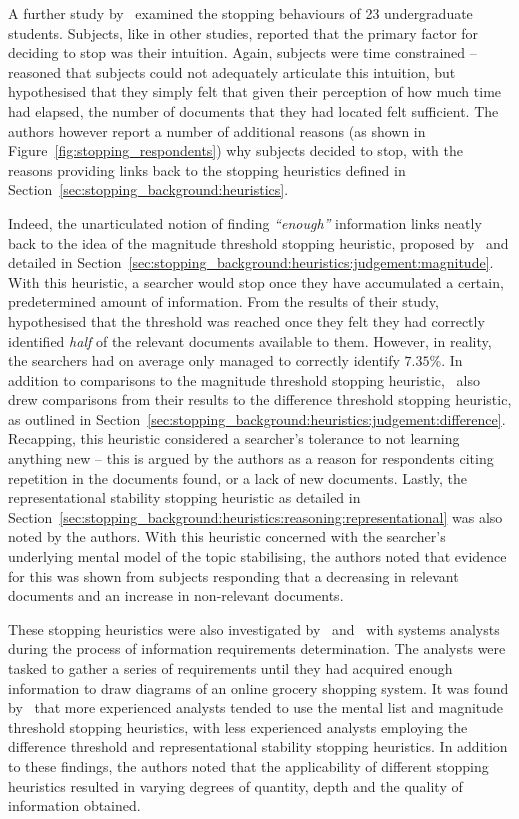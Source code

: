 A further study by~\cite{dostert2009satisficing} examined the stopping behaviours of 23 undergraduate students. Subjects, like in other studies, reported that the primary factor for deciding to stop was their intuition. Again, subjects were time constrained --~\cite{dostert2009satisficing} reasoned that subjects could not adequately articulate this intuition, but hypothesised that they simply felt that given their perception of how much time had elapsed, the number of documents that they had located felt sufficient. The authors however report a number of additional reasons (as shown in Figure~\ref{fig:stopping_respondents}) why subjects decided to stop, with the reasons providing links back to the stopping heuristics defined in Section~\ref{sec:stopping_background:heuristics}.

Indeed, the unarticulated notion of finding \emph{``enough''} information links neatly back to the idea of the magnitude threshold stopping heuristic, proposed by~\cite{nickles1995judgment} and detailed in Section~\ref{sec:stopping_background:heuristics:judgement:magnitude}. With this heuristic, a searcher would stop once they have accumulated a certain, predetermined amount of information. From the results of their study,~\cite{dostert2009satisficing} hypothesised that the threshold was reached once they felt they had correctly identified \emph{half} of the relevant documents available to them. However, in reality, the searchers had on average only managed to correctly identify $7.35\%$. In addition to comparisons to the magnitude threshold stopping heuristic,~\cite{dostert2009satisficing} also drew comparisons from their results to the difference threshold stopping heuristic, as outlined in Section~\ref{sec:stopping_background:heuristics:judgement:difference}. Recapping, this heuristic considered a searcher's tolerance to not learning anything new -- this is argued by the authors as a reason for respondents citing repetition in the documents found, or a lack of new documents. Lastly, the representational stability stopping heuristic as detailed in Section~\ref{sec:stopping_background:heuristics:reasoning:representational} was also noted by the authors. With this heuristic concerned with the searcher's underlying mental model of the topic stabilising, the authors noted that evidence for this was shown from subjects responding that a decreasing in relevant documents and an increase in non-relevant documents.

These stopping heuristics were also investigated by~\cite{browne2004stopping_rules} and~\cite{pitts2004stopping_rules} with systems analysts during the process of information requirements determination. The analysts were tasked to gather a series of requirements until they had acquired enough information to draw diagrams of an online grocery shopping system. It was found by~\cite{browne2004stopping_rules} that more experienced analysts tended to use the mental list and magnitude threshold stopping heuristics, with less experienced analysts employing the difference threshold and representational stability stopping heuristics. In addition to these findings, the authors noted that the applicability of different stopping heuristics resulted in varying degrees of quantity, depth and the quality of information obtained.


